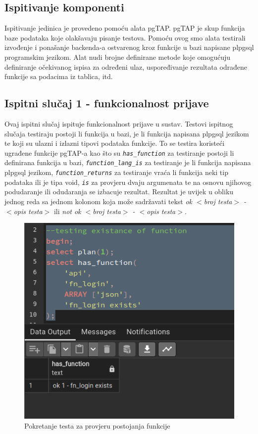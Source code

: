 			\subsection{Ispitivanje komponenti}
				Ispitivanje jedinica je provedeno pomoću alata pgTAP. pgTAP je skup funkcija baze podataka koje olakšavaju pisanje testova. Pomoću ovog smo alata testirali izvođenje i ponašanje backenda-a ostvarenog kroz funkcije u bazi napisane plpgsql programskim jezikom. Alat nudi brojne definirane metode koje omogućuju definiranje očekivanog ispisa za određeni ulaz, uspoređivanje rezultata odrađene funkcije sa podacima iz tablica, itd.
				\eject
				\subsection{Ispitni slučaj 1 - funkcionalnost prijave}
				Ovaj ispitni slučaj ispituje funkcionalnost prijave u sustav. Testovi ispitnog slučaja testiraju postoji li funkcija u bazi, je li funkcija napisana plpgsql jezikom te koji su ulazni i izlazni tipovi podataka funkcije. To se testira koristeći ugrađene funkcije pgTAP-a kao što su \textit{\texttt{has\_function}} za testiranje postoji li definirana funkcija u bazi, \textit{\texttt{function\_lang\_is}} za testiranje je li funkcija napisana plpgsql jezikom, \textit{\texttt{function\_returns}} za testiranje vraća li funkcija neki tip podataka ili je tipa void, \textit{\texttt{is\(\)}} za provjeru dvaju argumenata te na osnovu njihovog podudaranje ili odudaranja se izbacuje rezultat. Rezultat je uvijek u obliku jednog reda sa jednom kolonom koja može sadržavati tekst \textit{ok $<$broj testa$>$ - $<$opis testa$>$} ili \textit{not ok $<$broj testa$>$ - $<$opis testa$>$}.
				\begin{figure}[H]
					\centering
					\includegraphics[width=\textwidth]{slike/unit_tests/ut_1/has_func.png}
					\caption{Pokretanje testa za provjeru postojanja funkcije}
					\label{fig: IS1-has_function}
				\end{figure}
